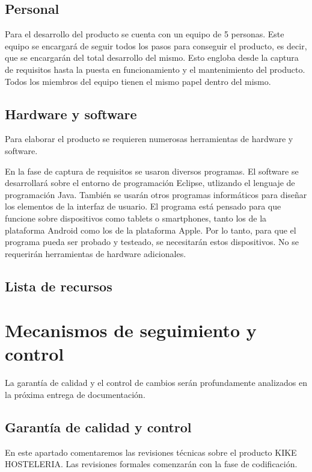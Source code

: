 \documentclass[spanish,a4paper,12pt]{report}	%
\begin{document}
	\section{Personal}
		Para el desarrollo del producto se cuenta con un equipo de 5 personas. Este equipo se encargará de seguir todos los pasos para conseguir el producto, es decir,
		 que se encargarán del total desarrollo del mismo. Esto engloba desde la captura de requisitos hasta la puesta en funcionamiento y el mantenimiento del 
		 producto. Todos los miembros del equipo tienen el mismo papel dentro del mismo.
	\section{Hardware y software}
		Para elaborar el producto se requieren numerosas herramientas de hardware y software.  

		En la fase de captura de requisitos se usaron diversos programas. 
		El software se desarrollará sobre el entorno de programación Eclipse, utlizando el lenguaje de programación Java. También se usarán otros programas informáticos 
		para diseñar los elementos de la interfaz de usuario. El programa está pensado para que funcione sobre dispositivos como tablets o smartphones, 
		tanto los de la plataforma Android como los de la plataforma Apple. Por lo tanto, para que el programa pueda ser probado y testeado, 
		se necesitarán estos dispositivos. No se requerirán herramientas de hardware adicionales.

	\section{Lista de recursos}

\newpage
\mbox{}
\thispagestyle{empty}						%
\newpage
\setcounter{section}{0}



\chapter{Mecanismos de seguimiento y control} La garantía de calidad y el control de cambios serán profundamente analizados en la próxima entrega de documentación.

	\section{Garantía de calidad y control} 
En este apartado comentaremos las revisiones técnicas sobre el producto KIKE HOSTELERIA. Las revisiones formales comenzarán con la fase de codificación.
\end{document}
